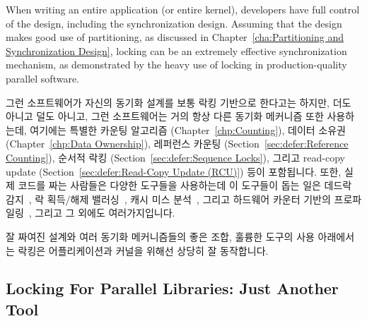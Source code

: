 When writing an entire application (or entire kernel), developers have
full control of the design, including the synchronization design.
Assuming that the design makes good use of partitioning, as discussed in
Chapter~\ref{cha:Partitioning and Synchronization Design}, locking
can be an extremely effective synchronization mechanism, as demonstrated
by the heavy use of locking in production-quality parallel software.
\fi

그런 소프트웨어가 자신의 동기화 설계를 보통 락킹 기반으로 한다고는 하지만, 더도
아니고 덜도 아니고, 그런 소프트웨어는 거의 항상 다른 동기화 메커니즘 또한
사용하는데, 여기에는 특별한 카운팅 알고리즘 (Chapter~\ref{chp:Counting}),
데이터 소유권 (Chapter~\ref{chp:Data Ownership}),
레퍼런스 카운팅 (Section~\ref{sec:defer:Reference Counting}),
순서적 락킹 (Section~\ref{sec:defer:Sequence Locks}), 그리고
read-copy update (Section~\ref{sec:defer:Read-Copy Update (RCU)}) 등이
포함됩니다.
또한, 실제 코드를 짜는 사람들은 다양한 도구들을 사용하는데 이 도구들이 돕는
일은 데드락 감지~\cite{JonathanCorbet2006lockdep}, 락 획득/해제
밸러싱~\cite{JonathanCorbet2004sparse}, 캐시 미스 분석~\cite{ValgrindHomePage},
그리고 하드웨어 카운터 기반의
프로파일링~\cite{LinuxKernelPerfWiki,OProfileHomePage}, 그리고 그 외에도
여러가지입니다.

잘 짜여진 설계와 여러 동기화 메커니즘들의 좋은 조합, 훌륭한 도구의 사용
아래에서는 락킹은 어플리케이션과 커널을 위해선 상당히 잘 동작합니다.

\subsection{Locking For Parallel Libraries: Just Another Tool}
\label{sec:locking:Locking For Parallel Libraries: Just Another Tool}

